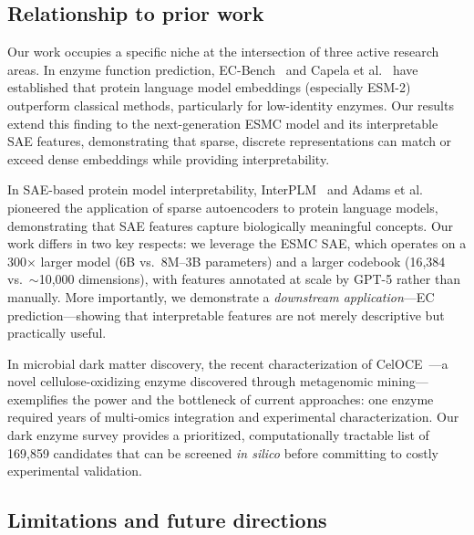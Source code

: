 \documentclass[12pt,a4paper]{article}
\begin{document}
\subsection{Relationship to prior work}

Our work occupies a specific niche at the intersection of three active research areas. In enzyme function prediction, EC-Bench~\cite{ecbench2025} and Capela et al.~\cite{capela2025comparative} have established that protein language model embeddings (especially ESM-2) outperform classical methods, particularly for low-identity enzymes. Our results extend this finding to the next-generation ESMC model and its interpretable SAE features, demonstrating that sparse, discrete representations can match or exceed dense embeddings while providing interpretability.

In SAE-based protein model interpretability, InterPLM~\cite{simon2025interplm} and Adams et al.~\cite{adams2025mechanistic} pioneered the application of sparse autoencoders to protein language models, demonstrating that SAE features capture biologically meaningful concepts. Our work differs in two key respects: we leverage the ESMC SAE, which operates on a 300$\times$ larger model (6B vs.\ 8M--3B parameters) and a larger codebook (16,384 vs.\ $\sim$10,000 dimensions), with features annotated at scale by GPT-5 rather than manually. More importantly, we demonstrate a \textit{downstream application}---EC prediction---showing that interpretable features are not merely descriptive but practically useful.

In microbial dark matter discovery, the recent characterization of CelOCE~\cite{santos2025metagenomic}---a novel cellulose-oxidizing enzyme discovered through metagenomic mining---exemplifies the power and the bottleneck of current approaches: one enzyme required years of multi-omics integration and experimental characterization. Our dark enzyme survey provides a prioritized, computationally tractable list of 169,859 candidates that can be screened \textit{in silico} before committing to costly experimental validation.

\subsection{Limitations and future directions}
\end{document}
